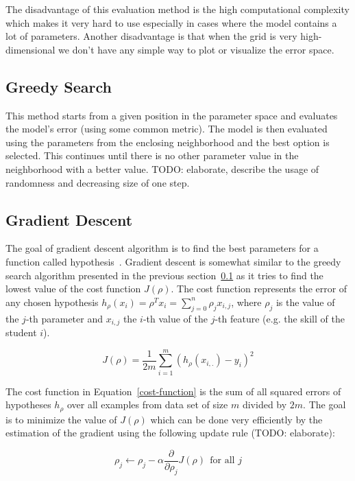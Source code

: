 The disadvantage of this evaluation method is the high computational complexity which makes it very hard to use especially in cases where the model contains a lot of parameters. Another disadvantage is that when the grid is very high-dimensional we don't have any simple way to plot or visualize the error space.

\subsection{Greedy Search}
\label{greedy-search}

This method starts from a given position in the parameter space and evaluates the model's error (using some common metric). The model is then evaluated using the parameters from the enclosing neighborhood and the best option is selected. This continues until there is no other parameter value in the neighborhood with a better value. TODO: elaborate, describe the usage of randomness and decreasing size of one step.

\subsection{Gradient Descent}
\label{gradient-descent}

The goal of gradient descent algorithm is to find the best parameters for a function called hypothesis~\cite{Klusasek2014}. Gradient descent is somewhat similar to the greedy search algorithm presented in the previous section~\ref{greedy-search} as it tries to find the lowest value of the cost function $J(\rho)$. The cost function represents the error of any chosen hypothesis $h_{\rho}(x_i) = \rho^T x_i = \sum^n_{j=0} \rho_j x_{i,j}$, where $\rho_j$ is the value of the $j$-th parameter and $x_{i,j}$ the $i$-th value of the $j$-th feature (e.g. the skill of the student $i$).

\begin{equation} \label{cost-function}
  J(\rho) = \frac{1}{2m} \sum^m_{i=1} (h_{\rho}(x_{i,.}) - y_i)^2
\end{equation}

The cost function in Equation~\ref{cost-function} is the sum of all squared errors of hypotheses $h_{\rho}$ over all examples from data set of size $m$ divided by $2m$. The goal is to minimize the value of $J(\rho)$ which can be done very efficiently by the estimation of the gradient using the following update rule (TODO: elaborate):

\begin{equation} \label{cost-function-update}
  \rho_j \gets \rho_j - \alpha \frac{\partial}{\partial \rho_j} J(\rho)~~\text{for all } j
\end{equation}

